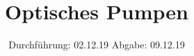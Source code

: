 
\setlength{\parindent}{0 pt}

\subject{V21}
\title{Optisches Pumpen}
\date{%
  Durchführung: 02.12.19
  \hspace{3em}
  Abgabe: 09.12.19
}



\maketitle
\thispagestyle{empty}
\tableofcontents
\newpage







\printbibliography{}


